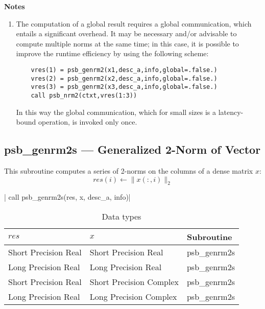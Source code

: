 {\par\noindent\large\bfseries Notes}
\begin{enumerate}
\item The computation of a global result requires a global
  communication, which entails a significant overhead. It may be
  necessary and/or advisable to compute multiple norms at the same
  time; in this case, it is possible to improve the runtime efficiency
  by using the following scheme:
  \begin{lstlisting}
    vres(1) = psb_genrm2(x1,desc_a,info,global=.false.)
    vres(2) = psb_genrm2(x2,desc_a,info,global=.false.)
    vres(3) = psb_genrm2(x3,desc_a,info,global=.false.)
    call psb_nrm2(ctxt,vres(1:3))
  \end{lstlisting}
  In this way the global communication, which for small sizes is a
  latency-bound operation, is invoked only once.
\end{enumerate}



\clearpage\subsection{psb\_genrm2s --- Generalized 2-Norm of Vector}

This subroutine computes a series of  2-norms on the columns of
a  dense matrix  $x$:
\[ res(i) \leftarrow \|x(:,i)\|_2 \]


\fortinline| call psb_genrm2s(res, x, desc_a, info)|

\begin{table}[h]
\begin{center}
\begin{tabular}{lll}
\hline
$res$ & $x$ & {\bf Subroutine}\\
\hline
Short Precision Real&Short Precision Real & psb\_genrm2s \\
Long Precision Real&Long Precision Real & psb\_genrm2s \\
Short Precision Real&Short Precision Complex & psb\_genrm2s \\
Long Precision Real&Long Precision Complex & psb\_genrm2s \\
\hline
\end{tabular}
\end{center}
\caption{Data types\label{tab:f90nrm2s}}
\end{table}

